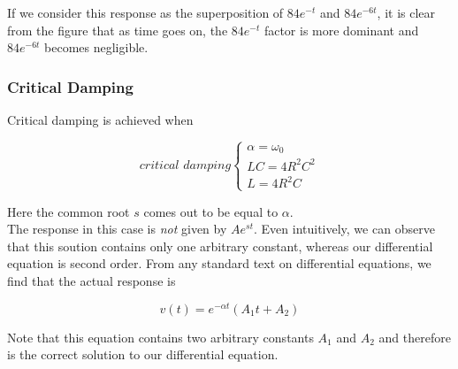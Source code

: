 \documentclass[11pt]{article}
\numberwithin{equation}{section}
\begin{document}
\begin{flushleft}
If we consider this response as the superposition of $84e^{-t}$ and $84e^{-6t}$, it is clear from the figure that as time goes on, the $84e^{-t}$ factor is more dominant and $84e^{-6t}$ becomes negligible.

\color{blue}
\subsubsection{Critical Damping}
\color{black}

Critical damping is achieved when 

\begin{equation*}
\textit{critical damping} \begin{cases} 
          \alpha = \omega_0 \\
          LC = 4R^2C^2\\
          L = 4R^2C
       \end{cases}
\end{equation*}

Here the common root $s$ comes out to be equal to $\alpha$.\\
The response in this case is \textit{not} given by $Ae^{st}$. Even intuitively, we can observe that this soution contains only one arbitrary constant, whereas our differential equation is second order. From any standard text on differential equations, we find that the actual response is 

\begin{equation}
v(t) = e^{-\alpha t}(A_1t + A_2)
\end{equation}

Note that this equation contains two arbitrary constants $A_1$ and $A_2$ and therefore is the correct solution to our differential equation.

\end{flushleft}
\end{document}
